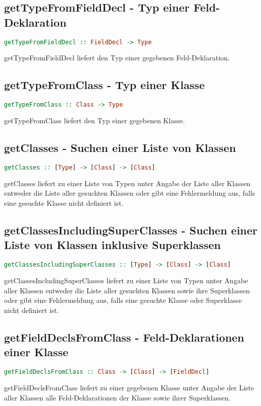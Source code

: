 \documentclass[a4paper,10pt]{article}
\begin{document}
\subsection{getTypeFromFieldDecl - Typ einer Feld-Deklaration}
\begin{lstlisting}[language=Haskell]
getTypeFromFieldDecl :: FieldDecl -> Type
\end{lstlisting}
getTypeFromFieldDecl liefert den Typ einer gegebenen Feld-Deklaration.
\\
\subsection{getTypeFromClass - Typ einer Klasse}
\begin{lstlisting}[language=Haskell]
getTypeFromClass :: Class -> Type
\end{lstlisting}
getTypeFromClass liefert den Typ einer gegebenen Klasse.
\\
\subsection{getClasses - Suchen einer Liste von Klassen}
\begin{lstlisting}[language=Haskell]
getClasses :: [Type] -> [Class] -> [Class]
\end{lstlisting}
getClasses liefert zu einer Liste von Typen unter Angabe der Liste aller Klassen entweder die Liste aller gesuchten Klassen oder gibt eine Fehlermeldung aus,
falls eine gesuchte Klasse nicht definiert ist.
\\
\subsection{getClassesIncludingSuperClasses - Suchen einer Liste von Klassen inklusive Superklassen}
\begin{lstlisting}[language=Haskell]
getClassesIncludingSuperClasses :: [Type] -> [Class] -> [Class]
\end{lstlisting}
getClassesIncludingSuperClasses liefert zu einer Liste von Typen unter Angabe aller Klassen entweder die Liste aller gesuchten Klassen sowie ihre Superklassen
oder gibt eine Fehlermeldung aus, falls eine gesuchte Klasse oder Superklasse nicht definiert ist.
\\
\newpage
\subsection{getFieldDeclsFromClass - Feld-Deklarationen einer Klasse}
\begin{lstlisting}[language=Haskell]
getFieldDeclsFromClass :: Class -> [Class] -> [FieldDecl]
\end{lstlisting}
getFieldDeclsFromClass liefert zu einer gegebenen Klasse unter Angabe der Liste aller Klassen alle Feld-Deklarationen der Klasse sowie ihrer Superklassen.
\\
\end{document}

